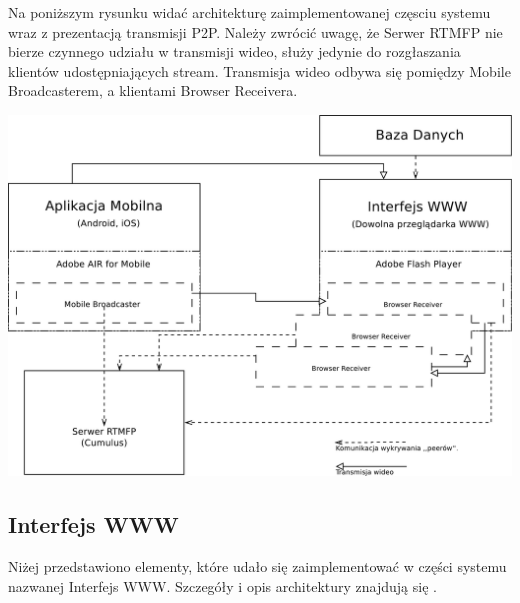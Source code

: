 \newpage
Na poniższym rysunku widać architekturę  zaimplementowanej częsciu systemu wraz z prezentacją transmisji P2P. Należy zwrócić uwagę, że Serwer RTMFP nie bierze czynnego udziału w transmisji wideo, służy jedynie do rozgłaszania klientów udostępniających stream. Transmisja wideo odbywa się pomiędzy Mobile Broadcasterem, a klientami Browser Receivera.
\begin{center}
    \includegraphics[width=\textwidth]{diagramy/architektura-implementacja.pdf}
    \label{fig:architekturaImplementacji}
\end{center}

\subsection{Interfejs WWW}
Niżej przedstawiono elementy, które udało się zaimplementować w części systemu nazwanej Interfejs WWW. Szczegóły i opis architektury znajdują się .

